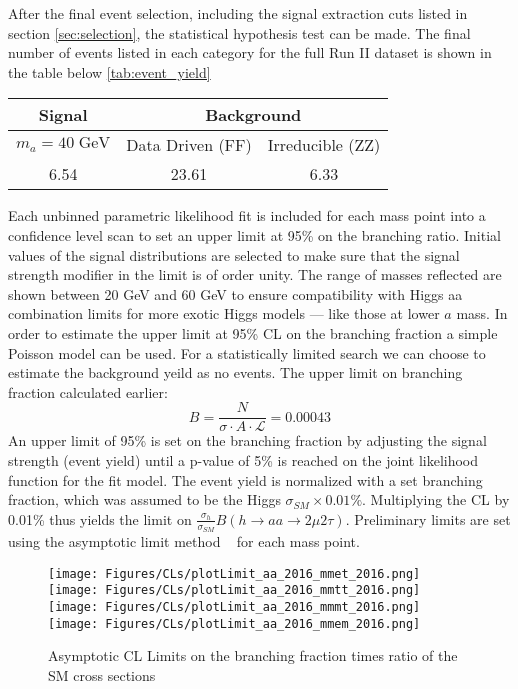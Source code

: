 

After the final event selection, including the signal extraction cuts listed in section \ref{sec:selection}, the statistical hypothesis test can be made. 
The final number of events listed in each category for the full Run II dataset is shown in the table below \ref{tab:event_yield}


\begin{table}[h!tbp]
\centering
{}
\begin{tabular*}{0.6\textwidth}{c|c|c}
\hline
Signal & \multicolumn{2}{c}{Background} \\
\hline $m_a=40\;\text{GeV}$ & Data Driven (FF) & Irreducible (ZZ)\\\hline
6.54   & 23.61 & 6.33 \\\hline
\end{tabular*}
\end{table}
 



Each unbinned parametric likelihood fit is included for each mass point into a confidence level scan to set an upper limit at 95\% on the branching ratio. Initial values of the signal distributions are selected to make sure that the signal strength modifier in the limit is of order unity. The range of masses reflected are shown between 20 GeV and 60 GeV to ensure compatibility with Higgs aa combination limits for more exotic Higgs models --- like those at lower $a$ mass. 
In order to estimate the upper limit at 95\% CL on the branching fraction a simple Poisson model can be used. For a statistically limited search we can choose to estimate the background yeild as no events. The upper limit on branching fraction calculated earlier: 
\[B =  \frac{N}{\sigma \cdot A\cdot \mathcal{L}} = 0.00043\] 
An upper limit of 95\% is set on the branching fraction by adjusting the signal strength (event yield) until a p-value of 5\% is reached on the joint likelihood function for the fit model. 
The event yield is normalized with a set branching fraction, which was assumed to be the Higgs $\sigma_{SM} \times 0.01\%$.
Multiplying the CL by 0.01\% thus yields the limit on $\frac{\sigma_h}{\sigma_{SM}} B(h\rightarrow aa\rightarrow2\mu2\tau)$.
Preliminary limits are set using the asymptotic limit method ~\cite{Cowan_2011} for each mass point.


\begin{figure}[ht!b]
  \centering
  \texttt{[image: Figures/CLs/plotLimit\_aa\_2016\_mmet\_2016.png]}
  \texttt{[image: Figures/CLs/plotLimit\_aa\_2016\_mmtt\_2016.png]}\\
  \texttt{[image: Figures/CLs/plotLimit\_aa\_2016\_mmmt\_2016.png]}
  \texttt{[image: Figures/CLs/plotLimit\_aa\_2016\_mmem\_2016.png]}\\
    \caption{\label{fig:CLs2016} Asymptotic CL Limits on the branching fraction times ratio of the SM cross sections}
\end{figure}

